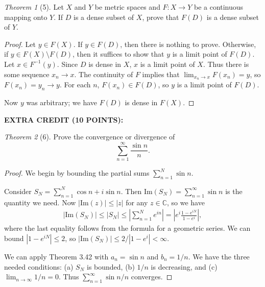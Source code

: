 \documentclass[12pt]{article}
\theoremstyle{remark}
\theoremstyle{named}
\newtheorem*{theorem}{Theorem}
\newcommand{\C}{\mathbb C}
\renewcommand{\Im}{\text{Im}}
\begin{document}
\begin{theorem}[5]
    Let \(X\) and \(Y\) be metric spaces and \(F : X \to Y\) be a continuous mapping onto \(Y\). If \(D\) is a dense subset of \(X\), prove that \(F(D)\) is a dense subset of \(Y\). 
\end{theorem}

\begin{proof}
    Let \(y \in F(X)\). If \(y \in F(D)\), then there is nothing to prove. Otherwise, if \(y \in F(X) \setminus F(D)\), then it suffices to show that \(y\) is a limit point of \(F(D)\). Let \(x \in F^{-1}(y)\). Since \(D\) is dense in \(X\), \(x\) is a limit point of \(X\). Thus there is some sequence \(x_n \to x\). The continuity of \(F\) implies that \(\lim_{x_n \to x} F(x_n) = y\), so \(F(x_n) = y_n \to y\). For each \(n\), \(F(x_n) \in F(D)\), so \(y\) is a limit point of \(F(D)\). 

    Now \(y\) was arbitrary; we have \(F(D)\) is dense in \(F(X)\). 
\end{proof}

\textbf{EXTRA CREDIT (10 POINTS):}

\begin{theorem}[6]
    Prove the convergence or divergence of
    \[\sum_{n = 1}^\infty\frac{\sin n}{n}.\]
\end{theorem}

\begin{proof}
    We begin by bounding the partial sums \(\sum_{n = 1}^N \sin n\).

    Consider \(S_N = \sum_{n = 1}^N \cos n + i \sin n\). Then \(\text{Im}(S_N) = \sum_{n = 1}^\infty \sin n\) is the quantity we need. Now \(|\Im(z)| \le |z|\) for any \(z \in \C\), so we have
    \begin{align*}
        |\Im(S_N)| \le |S_N| \le \left|\sum_{n = 1}^N e^{in}\right| = \left|e^i\frac{1 - e^{iN}}{1 - e^i}\right|,
    \end{align*}
    where the last equality follows from the formula for a geometric series. We can bound \(|1 - e^{iN}| \le 2\), so \(|\Im(S_N)| \le 2 / |1 - e^i| < \infty\).

    We can apply Theorem 3.42 with \(a_n = \sin n\) and \(b_n = 1/n\). We have the three needed conditions: (a) \(S_N\) is bounded, (b) \(1/n\) is decreasing, and (c) \(\lim_{n \to \infty} 1/ n = 0\). Thus \(\sum_{n = 1}^\infty \sin n / n\) converges.
\end{proof}
\end{document}
